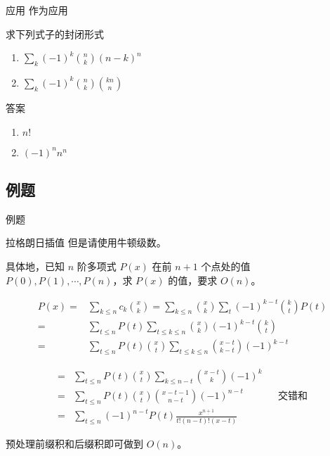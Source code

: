 \documentclass[UTF8]{beamer}
\begin{document}
    \begin{frame}{应用}
        作为应用
        \begin{block}{求下列式子的封闭形式}
            \begin{enumerate}
                \item $\displaystyle \sum_{k}(-1)^k\binom{n}{k}(n-k)^n$
                \item $\displaystyle \sum_{k}(-1)^k\binom{n}{k}\binom{kn}{n}$
            \end{enumerate}
        \end{block}
        \pause
        \begin{block}{答案}
            \begin{enumerate}
                \item $n!$
                \item $(-1)^nn^n$
            \end{enumerate}
        \end{block}
    \end{frame}

    \subsection{例题}
    \begin{frame}{例题}
        \begin{block}{拉格朗日插值}
            但是请使用牛顿级数。

            具体地，已知 $n$ 阶多项式 $P(x)$ 在前 $n + 1$ 个点处的值
            $P(0), P(1),\cdots, P(n)$，求 $P(x)$ 的值，要求 $O(n)$。
        \end{block}
        \pause

        $$
        \begin{aligned}
            P(x)= & \sum_{k\leq n}c_k\binom xk=\sum_{k\leq n}\binom xk\sum_{t}(-1)^{k-t}\binom kt P(t)\\
                = & \sum_{t\leq n}P(t)\sum_{t\leq k\leq n}\binom xk(-1)^{k-t}\binom kt\\
                = & \sum_{t\leq n}P(t)\binom xt\sum_{t\leq k\leq n}\binom {x-t}{k-t}(-1)^{k-t}
        \end{aligned}
        $$
    \end{frame}

    \begin{frame}
        $$
        \begin{aligned}
            = & \sum_{t\leq n}P(t)\binom xt\sum_{k\leq n-t}\binom{x-t}k(-1)^k\\
            = & \sum_{t\leq n}P(t)\binom xt\binom{x-t-1}{n-t}(-1)^{n-t}&&\text{交错和}\\
            = & \sum_{t\leq n}(-1)^{n-t}P(t)\frac{x^{\underline{n+1}}}{t!(n-t)!(x-t)}
        \end{aligned}
        $$

        预处理前缀积和后缀积即可做到 $O(n)$。
    \end{frame}
\end{document}
